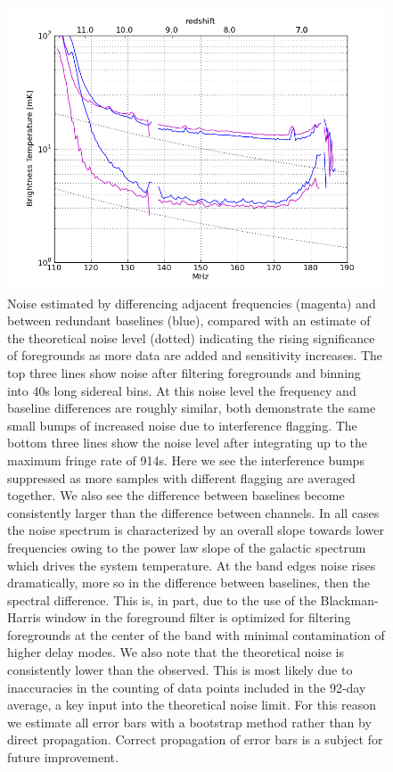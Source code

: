 \documentclass[preprint]{aastex}
\begin{document}
\begin{figure}
\centering
\includegraphics[width=\textwidth]{figures/psa32_trms_with_and_without_fr_filtering_z.png}
\caption{\label{fig:noise} Noise estimated by differencing adjacent frequencies (magenta) and between redundant baselines (blue), compared with an estimate of the theoretical noise level (dotted) indicating the rising significance of foregrounds as more data are added and sensitivity increases. The top three lines show noise after filtering foregrounds and binning into 40s long sidereal bins.  At this noise level the frequency and baseline differences are roughly similar, both demonstrate the same small bumps of increased noise due to interference flagging.  The bottom three lines show the noise level after integrating up to the maximum fringe rate of 914s. Here we see the interference bumps suppressed as more samples with different flagging are averaged together. We also see the difference between baselines become consistently larger than the difference between channels. In all cases the noise spectrum is characterized by an overall slope towards lower frequencies owing to the power law slope of the galactic spectrum which drives the system temperature.  At the band edges noise rises dramatically, more so in the difference between baselines, then the spectral difference.  This is, in part, due to the use of the Blackman-Harris window in the foreground filter is optimized for filtering foregrounds at the center of the band with minimal contamination of higher delay modes. We also note that the theoretical noise is consistently lower than the observed.  This is most likely due to inaccuracies in the counting of data points included in the 92-day average, a key input into the theoretical noise limit. For this reason we estimate all error bars with a bootstrap method rather than by direct propagation.  Correct propagation of error bars is a subject for future improvement.}
\end{figure}
\end{document}
